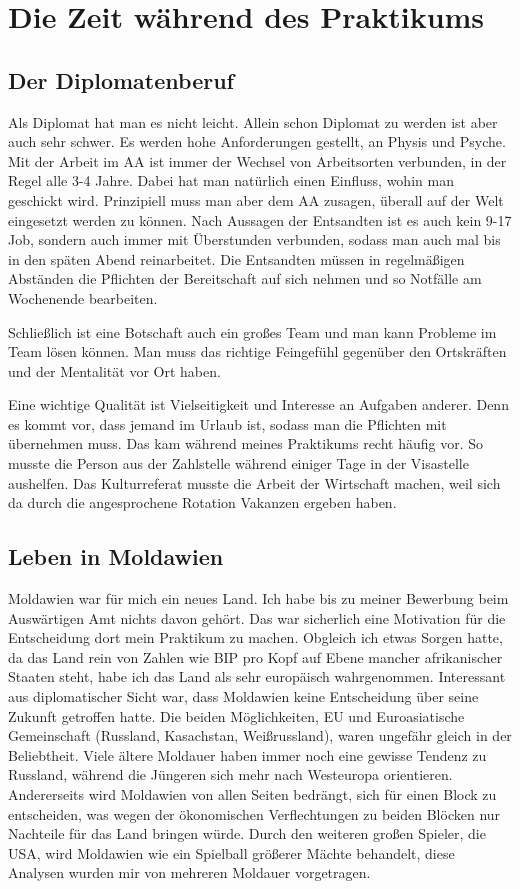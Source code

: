 \documentclass{../../sem_paper}
\begin{document}
\newpage
\section{Die Zeit während des Praktikums}

\subsection{Der Diplomatenberuf}
Als Diplomat hat man es nicht leicht. Allein schon Diplomat zu werden ist aber auch sehr schwer. Es werden hohe Anforderungen gestellt, an Physis und Psyche. Mit der Arbeit im AA ist immer der Wechsel von Arbeitsorten verbunden, in der Regel alle 3-4 Jahre. Dabei hat man natürlich einen Einfluss, wohin man geschickt wird. Prinzipiell muss man aber dem AA zusagen, überall auf der Welt eingesetzt werden zu können. Nach Aussagen der Entsandten ist es auch kein 9-17 Job, sondern auch immer mit Überstunden verbunden, sodass man auch mal bis in den späten Abend reinarbeitet. Die Entsandten müssen in regelmäßigen Abständen die Pflichten der Bereitschaft auf sich nehmen und so Notfälle am Wochenende bearbeiten.

Schließlich ist eine Botschaft auch ein großes Team und man kann Probleme im Team lösen können. Man muss das richtige Feingefühl gegenüber den Ortskräften und der Mentalität vor Ort haben.

Eine wichtige Qualität ist Vielseitigkeit und Interesse an Aufgaben anderer. Denn es kommt vor, dass jemand im Urlaub ist, sodass man die Pflichten mit übernehmen muss. Das kam während meines Praktikums recht häufig vor. So musste die Person aus der Zahlstelle während einiger Tage in der Visastelle aushelfen. Das Kulturreferat musste die Arbeit der Wirtschaft machen, weil sich da durch die angesprochene Rotation Vakanzen ergeben haben.

\subsection{Leben in Moldawien}
Moldawien war für mich ein neues Land. Ich habe bis zu meiner Bewerbung beim Auswärtigen Amt nichts davon gehört. Das war sicherlich eine Motivation für die Entscheidung dort mein Praktikum zu machen. Obgleich ich etwas Sorgen hatte, da das Land rein von Zahlen wie BIP pro Kopf auf Ebene mancher afrikanischer Staaten steht, habe ich das Land als sehr europäisch wahrgenommen. Interessant aus diplomatischer Sicht war, dass Moldawien keine Entscheidung über seine Zukunft getroffen hatte. Die beiden Möglichkeiten, EU und Euroasiatische Gemeinschaft (Russland, Kasachstan, Weißrussland), waren ungefähr gleich in der Beliebtheit. Viele ältere Moldauer haben immer noch eine gewisse Tendenz zu Russland, während die Jüngeren sich mehr nach Westeuropa orientieren. Andererseits wird Moldawien von allen Seiten bedrängt, sich für einen Block zu entscheiden, was wegen der ökonomischen Verflechtungen zu beiden Blöcken nur Nachteile für das Land bringen würde. Durch den weiteren großen Spieler, die USA, wird Moldawien wie ein Spielball größerer Mächte behandelt, diese Analysen wurden mir von mehreren Moldauer vorgetragen.
\end{document}

